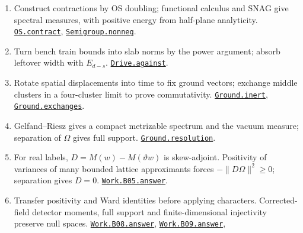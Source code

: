\documentclass[
  letterpaper,
  11pt]{article}
\providecommand{\tightlist}{%
  \setlength{\itemsep}{0pt}\setlength{\parskip}{0pt}}
\begin{document}
\begin{enumerate}
\def\labelenumi{\arabic{enumi}.}
\tightlist
\item
  Construct contractions by OS doubling; functional calculus and SNAG
  give spectral measures, with positive energy from half-plane
  analyticity.
  \href{https://github.com/yang-mills-group/OpenAI-YM-20261028/blob/3456e5e75cf8d4cd558955a5c7638fba2d68f464/YM/OS/Flow.lean\#L70-L89}{\texttt{OS.contract}},
  \href{https://github.com/yang-mills-group/OpenAI-YM-20261028/blob/3456e5e75cf8d4cd558955a5c7638fba2d68f464/YM/Heat/Lift.lean\#L102-L104}{\texttt{Semigroup.nonneg}}.
\item
  Turn bench train bounds into slab norms by the power argument; absorb
  leftover width with \(E_{d-s}\).
  \href{https://github.com/yang-mills-group/OpenAI-YM-20261028/blob/3456e5e75cf8d4cd558955a5c7638fba2d68f464/YM/OS/Train.lean\#L20-L60}{\texttt{Drive.against}}.
\item
  Rotate spatial displacements into time to fix ground vectors; exchange
  middle clusters in a four-cluster limit to prove commutativity.
  \href{https://github.com/yang-mills-group/OpenAI-YM-20261028/blob/3456e5e75cf8d4cd558955a5c7638fba2d68f464/YM/Ground/Lean.lean\#L185-L188}{\texttt{Ground.inert}},
  \href{https://github.com/yang-mills-group/OpenAI-YM-20261028/blob/3456e5e75cf8d4cd558955a5c7638fba2d68f464/YM/Ground/Permute.lean\#L72-L93}{\texttt{Ground.exchanges}}.
\item
  Gelfand--Riesz gives a compact metrizable spectrum and the vacuum
  measure; separation of \(\Omega\) gives full support.
  \href{https://github.com/yang-mills-group/OpenAI-YM-20261028/blob/3456e5e75cf8d4cd558955a5c7638fba2d68f464/YM/Ground/Spectrum.lean\#L126-L140}{\texttt{Ground.resolution}}.
\item
  For real labels, \(D=M(w)-M(\vartheta w)\) is skew-adjoint. Positivity
  of variances of many bounded lattice approximants forces
  \(-\|D\Omega\|^2\ge0\); separation gives \(D=0\).
  \href{https://github.com/yang-mills-group/OpenAI-YM-20261028/blob/3456e5e75cf8d4cd558955a5c7638fba2d68f464/YM/Work/B05.lean\#L90-L115}{\texttt{Work.B05.answer}}.
\item
  Transfer positivity and Ward identities before applying characters.
  Corrected-field detector moments, full support and finite-dimensional
  injectivity preserve null spaces.
  \href{https://github.com/yang-mills-group/OpenAI-YM-20261028/blob/3456e5e75cf8d4cd558955a5c7638fba2d68f464/YM/Work/B08.lean\#L206-L209}{\texttt{Work.B08.answer}},
  \href{https://github.com/yang-mills-group/OpenAI-YM-20261028/blob/3456e5e75cf8d4cd558955a5c7638fba2d68f464/YM/Work/B09.lean\#L12-L15}{\texttt{Work.B09.answer}},

\end{enumerate}
\end{document}
